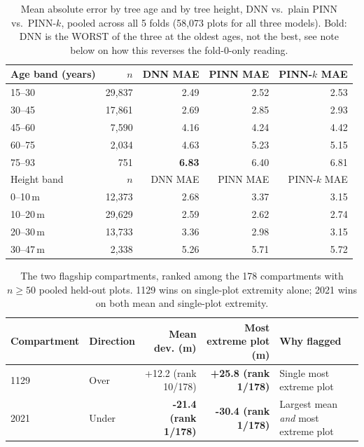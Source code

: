 \begin{table}[H]
\centering
\small
\begin{tabular}{lrrrr}
\toprule
Age band (years) & $n$ & DNN MAE & PINN MAE & PINN-$k$ MAE \\
\midrule
15--30 & 29,837 & 2.49 & 2.52 & 2.53 \\
30--45 & 17,861 & 2.69 & 2.85 & 2.93 \\
45--60 & 7,590 & 4.16 & 4.24 & 4.42 \\
60--75 & 2,034 & 4.63 & 5.23 & 5.15 \\
75--93 & 751 & \textbf{6.83} & 6.40 & 6.81 \\
\midrule
Height band & $n$ & DNN MAE & PINN MAE & PINN-$k$ MAE \\
\midrule
0--10\,m & 12,373 & 2.68 & 3.37 & 3.15 \\
10--20\,m & 29,629 & 2.59 & 2.62 & 2.74 \\
20--30\,m & 13,733 & 3.36 & 2.98 & 3.15 \\
30--47\,m & 2,338 & 5.26 & 5.71 & 5.72 \\
\bottomrule
\end{tabular}
\caption{\small{Mean absolute error by tree age and by tree height, DNN vs.\ plain PINN vs.\
PINN-$k$, pooled across all 5 folds (58,073 plots for all three models). Bold: DNN is the
WORST of the three at the oldest ages, not the best, see note below on how this reverses the
fold-0-only reading.}} %
\label{tab:age-height-error}
\end{table}

\begin{table}[H]
\centering
\small
\begin{tabular}{llrrp{3.3cm}}
\toprule
Compartment & Direction & Mean dev. (m) & Most extreme plot (m) & Why flagged \\
\midrule
1129 & Over & +12.2 (rank 10/178) & \textbf{+25.8 (rank 1/178)} & Single most extreme plot \\
2021 & Under & \textbf{-21.4 (rank 1/178)} & \textbf{-30.4 (rank 1/178)} & Largest mean \emph{and} most extreme plot \\
\bottomrule
\end{tabular}
\caption{\small{The two flagship compartments, ranked among the 178 compartments with
$n\geq50$ pooled held-out plots. 1129 wins on single-plot extremity alone; 2021 wins on both
mean and single-plot extremity.}}
\label{tab:productivity-flagships}
\end{table}

